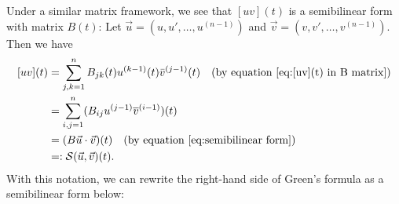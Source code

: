 \documentclass[12pt, oneside, a4paper]{article}
\begin{document}
Under a similar matrix framework, we see that $[uv](t)$ is a semibilinear form with matrix $B(t)$: Let $\vec{u}=(u, u', \ldots, u^{(n-1)})$ and $\vec{v}=(v, v', \ldots, v^{(n-1)})$. Then we have
\begin{equation}\label{[uv](t) in semibilinear form}
    \begin{split}
    [uv](t) &= \sum_{j,k=1}^n B_{jk}(t)u^{(k-1)}(t)\bar{v}^{(j-1)}(t)\quad\mbox{(by equation \eqref{eq:[uv](t) in B matrix})}\\
    &= \sum_{i,j=1}^n (B_{ij}u^{(j-1)}\overline{v}^{(i-1)})(t)\\
    &= (B\vec{u}\cdot \vec{v})(t)\quad\mbox{(by equation \eqref{eq:semibilinear form})}\\
    &=: \mathcal{S}(\vec{u},\vec{v})(t).
    \end{split}
\end{equation}
With this notation, we can rewrite the right-hand side of Green's formula as a semibilinear form below:
\end{document}
